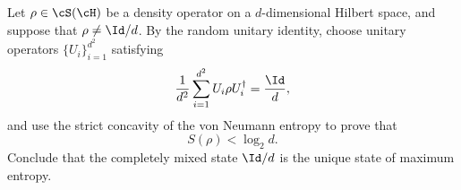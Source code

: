 Let $\rho\in \cS(\cH)$ be a density operator on a $d$-dimensional Hilbert space, and suppose that $\rho\neq \Id/d$.
By the random unitary identity, choose unitary operators $\{U_i\}_{i=1}^{d^2}$ satisfying
$$
\frac{1}{d^2}\sum_{i=1}^{d^2} U_i \rho U_i^\dagger
=
\frac{\Id}{d},
$$
and use the strict concavity of the von Neumann entropy to prove that
$$
S(\rho)<\log_2 d.
$$
Conclude that the completely mixed state $\Id/d$ is the unique state of maximum entropy.
